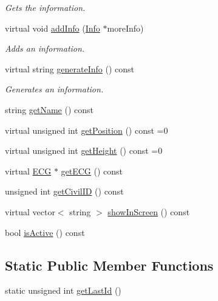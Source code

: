 \begin{DoxyCompactItemize}
\begin{DoxyCompactList}\small\item\em Gets the information. \end{DoxyCompactList}\item 
virtual void \hyperlink{class_worker_ad54db262f7473cc729c371dd54e292eb}{add\+Info} (\hyperlink{class_info}{Info} $\ast$more\+Info)
\begin{DoxyCompactList}\small\item\em Adds an information. \end{DoxyCompactList}\item 
virtual string \hyperlink{class_worker_ac77905603b86c58cb0a87d6389dca744}{generate\+Info} () const
\begin{DoxyCompactList}\small\item\em Generates an information. \end{DoxyCompactList}\item 
string \hyperlink{class_worker_aaaa5808dae61a91b5344224b0ec4d0aa}{get\+Name} () const
\item 
virtual unsigned int \hyperlink{class_worker_a5fd37dea8c5e6579c1deecbfc1b22db9}{get\+Position} () const =0
\item 
virtual unsigned int \hyperlink{class_worker_a1c5dcdc1c7dc5e498a44f678e964bbfd}{get\+Height} () const =0
\item 
virtual \hyperlink{class_e_c_g}{E\+CG} $\ast$ \hyperlink{class_worker_a625cb5da072fd244f38f42e15693058a}{get\+E\+CG} () const
\item 
unsigned int \hyperlink{class_worker_a29fed9c10e4e9a8c1bd4cdfa41add2d2}{get\+Civil\+ID} () const
\item 
virtual vector$<$ string $>$ \hyperlink{class_worker_aca1475c72f6e7c6b85114b0bba0da038}{show\+In\+Screen} () const
\item 
bool \hyperlink{class_worker_a59b1b4769ad7cc740b051e53c986b725}{is\+Active} () const
\end{DoxyCompactItemize}
\subsection*{Static Public Member Functions}
\begin{DoxyCompactItemize}
\item 
static unsigned int \hyperlink{class_worker_ab2ad8ec70eb7a478a3525e5114689625}{get\+Last\+Id} ()
\end{DoxyCompactItemize}
